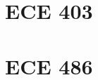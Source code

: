 \documentclass{formulae}
\begin{document}
\begin{multicols*}{2}

    \section{ECE 403}
    
    

    \section{ECE 486}
    
    
    
    
    
    

\end{multicols*}
\end{document}
